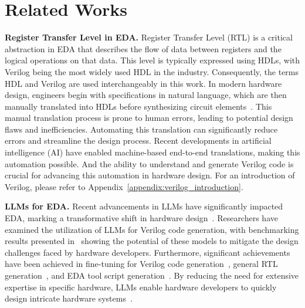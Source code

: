 \section{Related Works}

\textbf{Register Transfer Level in EDA.} 
Register Transfer Level (RTL) is a critical abstraction in EDA that describes the flow of data between registers and the logical operations on that data. This level is typically expressed using HDLs, with Verilog being the most widely used HDL in the industry.
Consequently, the terms HDL and Verilog are used interchangeably in this work.
In modern hardware design, engineers begin with specifications in natural language, which are then manually translated into HDLs before synthesizing circuit elements~\citep{blocklove2023chip}. This manual translation process is prone to human errors, leading to potential design flaws and inefficiencies. Automating this translation can significantly reduce errors and streamline the design process.
Recent developments in artificial intelligence (AI) have enabled machine-based end-to-end translations, making this automation possible. And the ability to understand and generate Verilog code is crucial for advancing this automation in hardware design.
For an introduction of Verilog, please refer to Appendix~\ref{appendix:verilog_introduction}.


\textbf{LLMs for EDA.} 
Recent advancements in LLMs have significantly impacted EDA, marking a transformative shift in hardware design~\citep{chen2024dawn}. Researchers have examined the utilization of LLMs for Verilog code generation, with benchmarking results presented in~\citet{thakur2023benchmarking,liu2023verilogeval,lu2024rtllm} showing the potential of these models to mitigate the design challenges faced by hardware developers.
Furthermore, significant achievements have been achieved in fine-tuning for Verilog code generation~\citep{chang2024data,thakur2024verigen}, general RTL generation~\citep{blocklove2023chip}, and EDA tool script generation~\citep{liu2023chipnemo,wu2024chateda}.
By reducing the need for extensive expertise in specific hardware, LLMs enable hardware developers to quickly design intricate hardware systems~\citep{fu2023gpt4aigchip}.


